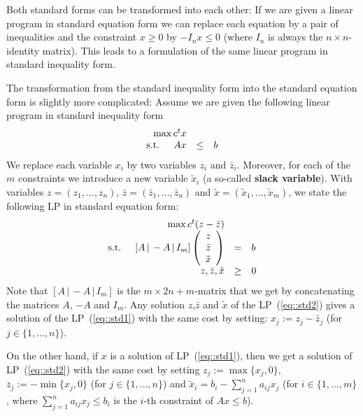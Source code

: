 \documentclass[12pt, showidx, twoside]{article}
\def\hi{\bf}
\begin{document}
Both standard forms can be transformed into each other:
If we are given a linear program in standard equation form we can 
replace each equation by a pair of inequalities and 
the constraint $x\geq 0$ by $-I_n x \leq 0$ (where $I_n$ is always 
the $n\times n$-identity matrix).
This leads to a formulation of the same linear program in standard 
inequality form.

The transformation from the standard inequality form into the
standard equation form is slightly more complicated:
Assume we are given the following linear program in standard
inequality form
\begin{equation}
\begin{array}{rcl}\label{eq::std1}
\max c^t x & & \\
 \mbox{s.t. \quad} Ax & \leq & b
\end{array}
\end{equation}
We replace each variable $x_i$ by two variables $z_i$ and
$\bar z_i$. Moreover, for each of the $m$ constraints we introduce
a new variable $\tilde x_i$
(a so-called {\hi slack variable}{}).
With variables $z=(z_1,\dots,z_n)$, $\bar z=(\bar z_1,\dots,\bar z_n)$ and
$\tilde x = (\tilde x_1,\dots,\tilde x_m)$, we state the following LP
in standard equation form:
\begin{equation}
\begin{array}{rcl}\label{eq::std2}
\max c^t (z - \bar z) & & \\
 \mbox{s.t. \quad} [A\,|\, -A\,|\, I_m] 
   \left( \begin{array}{c}
             z\\
           \bar z\\
          \tilde x
       \end{array}  \right) & = & b\\
    z, \bar z,\tilde x & \geq & 0\\
\end{array}
\end{equation}
Note that $[A \,|\, -A \,|\, I_m]$ is the $m \times {2n+m}$-matrix
that we get by concatenating the matrices $A$, $-A$ and $I_m$.
Any solution $z$,$\bar z$ and $\tilde x$ of the LP~(\ref{eq::std2})
gives a solution of the LP~(\ref{eq::std1}) with the same cost 
by setting: $x_j := z_j - \bar z_j$ (for $j \in \{1,\dots,n\}$).

On the other hand, if $x$ is a solution of LP~(\ref{eq::std1}),
then we get a solution of  LP~(\ref{eq::std2}) with the same cost
by 
setting $z_j := \max\{x_j,0\}$, $\bar z_j := -\min\{x_j,0\}$
(for $j \in \{1,\dots,n\}$) and $\tilde x_i = b_i - \sum_{j=1}^n a_{ij} x_j$
(for $i \in \{1,\dots,m\}$, where $\sum_{j=1}^n a_{ij} x_j \leq b_i$
is the $i$-th constraint of $Ax \leq b$).
\end{document}
